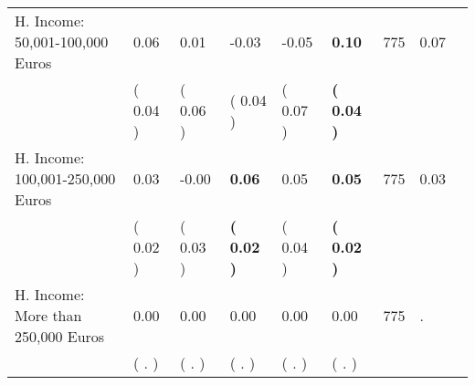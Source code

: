 \begin{tabular}{L{6.2cm} C{1.8cm} C{1.8cm} C{1.8cm} C{1.8cm} C{1.8cm} C{1.8cm} C{0.3cm} C{0.3cm}}
H. Income: 50,001-100,000 Euros &      0.06 &      0.01 &     -0.03 &     -0.05 & \textbf{     0.10}  & 775 &       0.07 \\ 
 & (     0.04 ) & (     0.06 ) & (     0.04 ) & (     0.07 ) & \textbf{(     0.04 )}  & \\
H. Income: 100,001-250,000 Euros &      0.03 &     -0.00 & \textbf{     0.06} &      0.05 & \textbf{     0.05}  & 775 &       0.03 \\ 
 & (     0.02 ) & (     0.03 ) & \textbf{(     0.02 )} & (     0.04 ) & \textbf{(     0.02 )}  & \\
H. Income: More than 250,000 Euros &      0.00 &      0.00 &      0.00 &      0.00 &      0.00  & 775 &          . \\ 
 & (        . ) & (        . ) & (        . ) & (        . ) & (        . )  & \\
\bottomrule
\end{tabular}
